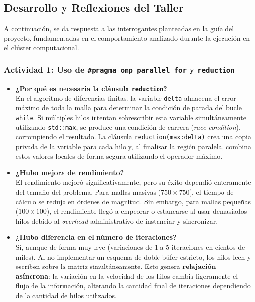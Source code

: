 \subsection{Desarrollo y Reflexiones del Taller}

A continuación, se da respuesta a las interrogantes planteadas en la guía del proyecto, fundamentadas en el comportamiento analizado durante la ejecución en el clúster computacional.

\subsubsection*{Actividad 1: Uso de \texttt{\#pragma omp parallel for} y \texttt{reduction}}
\begin{itemize}
    \item \textbf{¿Por qué es necesaria la cláusula \texttt{reduction}?} \\
    En el algoritmo de diferencias finitas, la variable \texttt{delta} almacena el error máximo de toda la malla para determinar la condición de parada del bucle \texttt{while}. Si múltiples hilos intentan sobrescribir esta variable simultáneamente utilizando \texttt{std::max}, se produce una condición de carrera (\textit{race condition}), corrompiendo el resultado. La cláusula \texttt{reduction(max:delta)} crea una copia privada de la variable para cada hilo y, al finalizar la región paralela, combina estos valores locales de forma segura utilizando el operador máximo.
    \item \textbf{¿Hubo mejora de rendimiento?} \\
    El rendimiento mejoró significativamente, pero su éxito dependió enteramente del tamaño del problema. Para mallas masivas ($750 \times 750$), el tiempo de cálculo se redujo en órdenes de magnitud. Sin embargo, para mallas pequeñas ($100 \times 100$), el rendimiento llegó a empeorar o estancarse al usar demasiados hilos debido al \textit{overhead} administrativo de instanciar y sincronizar.
    \item \textbf{¿Hubo diferencia en el número de iteraciones?} \\
    Sí, aunque de forma muy leve (variaciones de 1 a 5 iteraciones en cientos de miles). Al no implementar un esquema de doble búfer estricto, los hilos leen y escriben sobre la matriz simultáneamente. Esto genera \textbf{relajación asíncrona}: la variación en la velocidad de los hilos cambia ligeramente el flujo de la información, alterando la cantidad final de iteraciones dependiendo de la cantidad de hilos utilizados.
\end{itemize}

